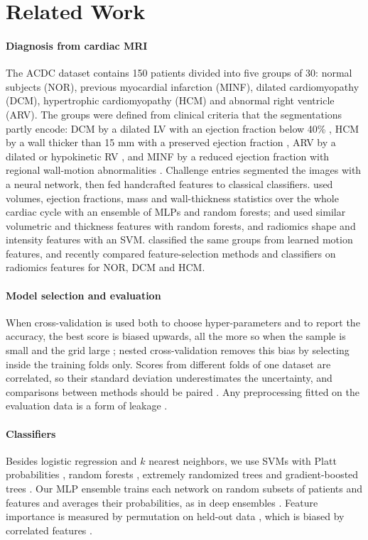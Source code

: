\section{Related Work}
\paragraph{Diagnosis from cardiac MRI}
The ACDC dataset \citep{bernard2018} contains 150 patients divided into five groups of 30: normal subjects (NOR), previous myocardial infarction (MINF), dilated cardiomyopathy (DCM), hypertrophic cardiomyopathy (HCM) and abnormal right ventricle (ARV). The groups were defined from clinical criteria that the segmentations partly encode: DCM by a dilated LV with an ejection fraction below 40\% \citep{pinto2016}, HCM by a wall thicker than 15 mm with a preserved ejection fraction \citep{elliott2014}, ARV by a dilated or hypokinetic RV \citep{marcus2010}, and MINF by a reduced ejection fraction with regional wall-motion abnormalities \citep{thygesen2019}. Challenge entries segmented the images with a neural network, then fed handcrafted features to classical classifiers. \citet{isensee2017} used volumes, ejection fractions, mass and wall-thickness statistics over the whole cardiac cycle with an ensemble of MLPs and random forests; \citet{khened2017} and \citet{wolterink2017} used similar volumetric and thickness features with random forests, and \citet{cetin2017} radiomics shape and intensity features with an SVM. \citet{zheng2019} classified the same groups from learned motion features, and \citet{zhang2023} recently compared feature-selection methods and classifiers on radiomics features for NOR, DCM and HCM.

\paragraph{Model selection and evaluation}
When cross-validation is used both to choose hyper-parameters and to report the accuracy, the best score is biased upwards, all the more so when the sample is small and the grid large \citep{varma2006,cawley2010}; nested cross-validation removes this bias by selecting inside the training folds only. Scores from different folds of one dataset are correlated, so their standard deviation underestimates the uncertainty, and comparisons between methods should be paired \citep{nadeau2003}. Any preprocessing fitted on the evaluation data is a form of leakage \citep{kaufman2012}.

\paragraph{Classifiers}
Besides logistic regression and $k$ nearest neighbors, we use SVMs \citep{cortes1995} with Platt probabilities \citep{platt1999}, random forests \citep{breiman2001}, extremely randomized trees \citep{geurts2006} and gradient-boosted trees \citep{chen2016}. Our MLP ensemble trains each network on random subsets of patients and features and averages their probabilities, as in deep ensembles \citep{lakshminarayanan2017}. Feature importance is measured by permutation on held-out data \citep{breiman2001}, which is biased by correlated features \citep{strobl2007}.
